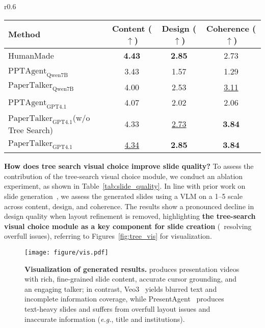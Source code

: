 \begin{wraptable}[8]{r}{0.6\textwidth} %
 \vspace{-1\baselineskip} 
  \centering
  \tablesize
  \caption{\textbf{Evaluation result on slide quality}.}
  {
  \setlength{\tabcolsep}{1pt} %
  \begin{tabular}{lccc}
    \toprule
    Method & Content ($\uparrow$) & Design ($\uparrow$) & Coherence ($\uparrow$) \\
    \midrule
    HumanMade & \textbf{4.43} & \textbf{2.85} & 2.73 \\
    \midrule
    $\text{PPTAgent}_\text{Qwen7B}$~\cite{zheng2025pptagent} & 3.43 & 1.57 & 1.29 \\
    $\text{PaperTalker}_\text{Qwen7B}$ & 4.00 & 2.53 & \underline{3.11} \\
    \midrule
    $\text{PPTAgent}_\text{GPT4.1}$~\cite{zheng2025pptagent} & 4.07 & 2.02 & 2.06 \\
    $\text{PaperTalker}_\text{GPT4.1}$(w/o Tree Search) & 4.33 & \underline{2.73} & \textbf{3.84} \\
    $\text{PaperTalker}_\text{GPT4.1}$ & \underline{4.34} & \textbf{2.85} & \textbf{3.84} \\
    \bottomrule
  \end{tabular}
  }
  \label{tab:slide_quality}
\end{wraptable}
\noindent\textbf{How does tree search visual choice improve slide quality?} To assess the contribution of the tree-search visual choice module, we conduct an ablation experiment, as shown in Table~\ref{tab:slide_quality}. In line with prior work on slide generation~\cite{zheng2025pptagent}, we assess the generated slides using a VLM on a 1–5 scale across content, design, and coherence. The results show a pronounced decline in design quality when layout refinement is removed, highlighting \textbf{the tree-search visual choice module as a key component for slide creation} (\ie~resolving overfull issues), referring to Figures~\ref{fig:tree_vis} for visualization.

\begin{figure}
    \centering
    \texttt{[image: figure/vis.pdf]}
    \captionsetup{skip=0pt}  
    \caption{\textbf{Visualization of generated results.} {\agent} produces presentation videos with rich, fine-grained slide content, accurate cursor grounding, and an engaging talker; in contrast, Veo3~\cite{deepmind2025veo3} yields blurred text and incomplete information coverage, while PresentAgent~\cite{shi2025presentagent} produces text-heavy slides and suffers from overfull layout issues and inaccurate information (\textit{e.g.}, title and institutions).}
    \label{fig:compare}
    \vspace{-0.2\baselineskip} 
\end{figure}
